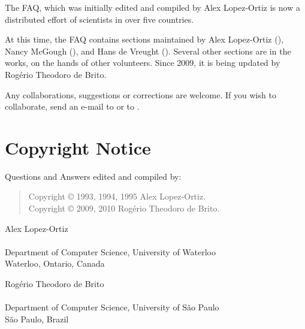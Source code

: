 The \scimath FAQ, which was initially edited and compiled by Alex
Lopez-Ortiz is now a distributed effort of scientists in over five
countries.

At this time, the FAQ contains sections maintained by Alex Lopez-Ortiz
(\emailalopez), Nancy McGough (\emailnancy), and Hans de Vreught
(\emailhans).  Several other sections are in the works, on the hands of
other volunteers. Since 2009, it is being updated by Rogério Theodoro de
Brito.

Any collaborations, suggestions or corrections are welcome. If you wish
to collaborate, send an e-mail to \emailrbrito or to \emailalopez.

\section{Copyright Notice}

Questions and Answers edited and compiled by:

\begin{verse}
  Copyright © 1993, 1994, 1995 Alex Lopez-Ortiz.\\
  Copyright © 2009, 2010 Rogério Theodoro de Brito.
\end{verse}

\noindent
Alex Lopez-Ortiz\\
\emailalopez\\
Department of Computer Science, University of Waterloo\\
Waterloo, Ontario, Canada

\medskip

\noindent
Rogério Theodoro de Brito\\
\emailrbrito\\
Department of Computer Science, University of São Paulo\\
São Paulo, Brazil
